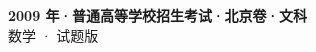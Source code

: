 \documentclass[zihao=-4, a4paper]{ctexart}
\begin{document}
\begin{center}
  {\Large\bfseries 2009 年·普通高等学校招生考试·北京卷·文科}\\[4pt]
  {\large 数学 · 试题版}
\end{center}
\medskip
{}

\end{document}
